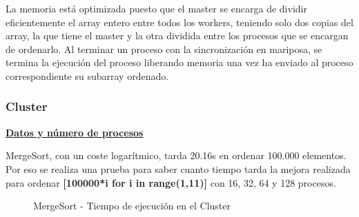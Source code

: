 		La memoria está optimizada puesto que el master se encarga de dividir eficientemente el array entero entre todos los workers, teniendo solo dos copias del array, la que tiene el master y la otra dividida entre los procesos que se encargan de ordenarlo. Al terminar un proceso con la sincronización en mariposa, se termina la ejecución del proceso liberando memoria una vez ha enviado al proceso correspondiente su subarray ordenado.
		
		
		\subsubsection{Cluster}
		
		\begin{flushleft}
		\begin{mdframed}[roundcorner=5pt]			
			\textbf{\underline{Datos y número de procesos}}
			\vspace{0.1cm}
			
			\scriptsize	
			MergeSort, con un coste logarítmico, tarda 20.16s en ordenar 100.000 elementos. Por eso se realiza una prueba para saber cuanto tiempo tarda la mejora realizada para ordenar \textbf{[100000*i for i in range(1,11)]} con 16, 32, 64 y 128 procesos.
			
		\end{mdframed}
		\end{flushleft}	
		
		\begin{figure}[!h]
			\centering
			\caption{MergeSort - Tiempo de ejecución en el Cluster}
		\end{figure}
		
